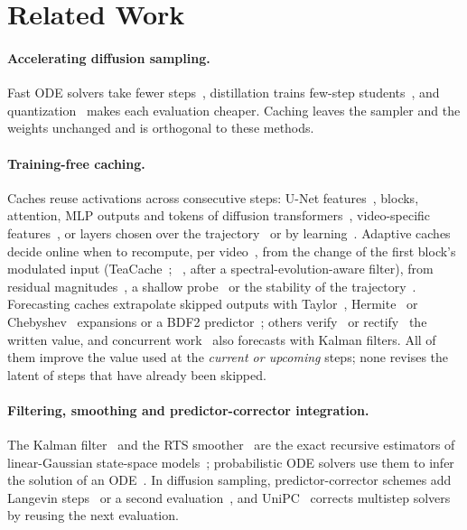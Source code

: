 \section{Related Work}
\label{sec:related}

\paragraph{Accelerating diffusion sampling.}
Fast ODE solvers take fewer steps~\cite{song2021ddim,lu2022dpmsolver,lu2025dpmsolverpp,zhao2023unipc,karras2022edm},
distillation trains few-step students~\cite{salimans2022progressive,song2023consistency,luo2023lcm,sauer2024add},
and quantization~\cite{li2023qdiffusion} makes each evaluation cheaper. Caching leaves the sampler and the weights
unchanged and is orthogonal to these methods.

\paragraph{Training-free caching.}
Caches reuse activations across consecutive steps: U-Net features~\cite{ma2024deepcache,wimbauer2024cache}, blocks,
attention, MLP outputs and tokens of diffusion transformers~\cite{selvaraju2024fora,zou2025toca}, video-specific
features~\cite{zhao2025pab,lv2025fastercache}, or layers chosen over the trajectory~\cite{chu2025omnicache} or by
learning~\cite{ma2024learningtocache}. Adaptive caches decide online when to recompute, per
video~\cite{kahatapitiya2025adacache}, from the change of the first block's modulated input (TeaCache~\cite{liu2025teacache};
\seacache~\cite{chung2026seacache}, after a spectral-evolution-aware filter), from residual
magnitudes~\cite{ma2025magcache}, a shallow probe~\cite{bu2026dicache} or the stability of the
trajectory~\cite{jiang2025sada}. Forecasting caches extrapolate skipped outputs with Taylor~\cite{liu2025taylorseer},
Hermite~\cite{feng2026hicache} or Chebyshev~\cite{han2026spectrum} expansions or a BDF2 predictor~\cite{zheng2026foca};
others verify~\cite{liu2025speca} or rectify~\cite{peng2026ertacache,shen2026gprefiner} the written value, and
concurrent work~\cite{rajabi2026speckcast} also forecasts with Kalman filters. All of them improve the value used at
the \emph{current or upcoming} steps; none revises the latent of steps that have already been skipped.

\paragraph{Filtering, smoothing and predictor-corrector integration.}
The Kalman filter~\cite{kalman1960new} and the RTS smoother~\cite{rauch1965maximum} are the exact recursive estimators
of linear-Gaussian state-space models~\cite{sarkka2013bayesian}; probabilistic ODE solvers use them to infer the
solution of an ODE~\cite{schober2019probabilistic,tronarp2019probabilistic}. In diffusion sampling, predictor-corrector
schemes add Langevin steps~\cite{song2021score} or a second evaluation~\cite{karras2022edm}, and
UniPC~\cite{zhao2023unipc} corrects multistep solvers~\cite{lu2025dpmsolverpp} by reusing the next evaluation.
